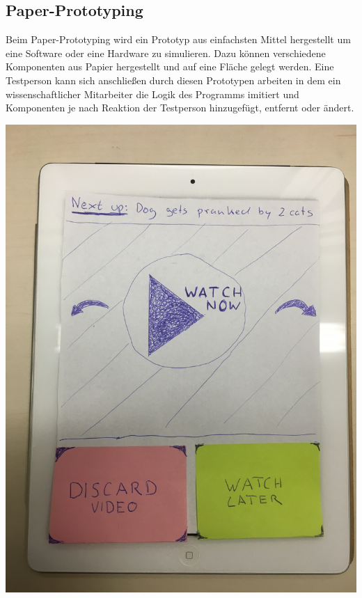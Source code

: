 \documentclass[a0,portrait]{a0poster}
\begin{document}
\begin{multicols}{2}
\subsection*{Paper-Prototyping}
Beim Paper-Prototyping wird ein Prototyp aus einfachsten Mittel hergestellt um eine Software oder eine Hardware zu simulieren. Dazu können verschiedene Komponenten aus Papier hergestellt und auf eine Fläche gelegt werden. Eine Testperson kann sich anschließen durch diesen Prototypen arbeiten in dem ein wissenschaftlicher Mitarbeiter die Logik des Programms imitiert und Komponenten je nach Reaktion der Testperson hinzugefügt, entfernt oder ändert.
\begin{center}\vspace{1cm}
\includegraphics[width=0.8\linewidth]{paper-prototype.jpg}
\end{center}\vspace{1cm}

\nocite{*} %
\printbibliography{}
\end{multicols}
\end{document}
